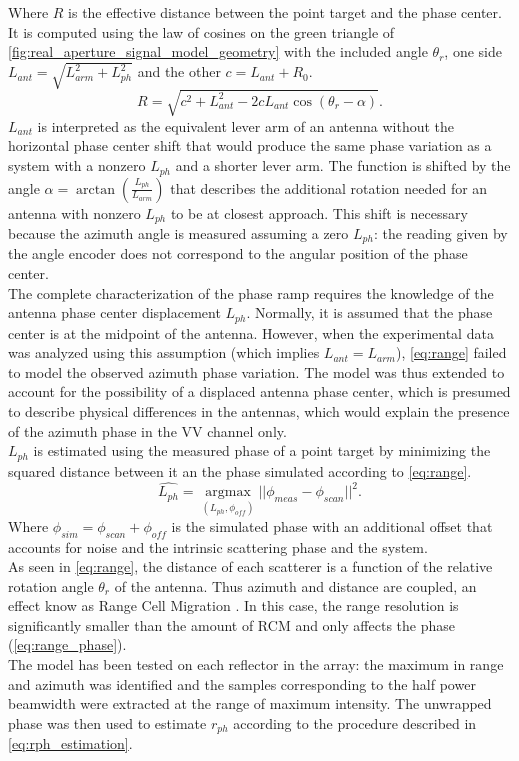Where $R$ is the effective distance between the point target and the phase center.
It is computed using the law of cosines on the green triangle of \autoref{fig:real_aperture_signal_model_geometry} with the included angle $\theta_r$, one  side $L_{ant} = \sqrt{L_{arm}^2 + L_{ph}^2}$ and the other $c = L_{ant} + R_0$.
\begin{equation}\label{eq:range}
	R = \sqrt{ c^2 +  L_{ant}^2 - 2 c L_{ant} \cos{\left(\theta_r - \alpha\right)}}.
\end{equation}
$L_{ant}$ is interpreted as the equivalent lever arm of an antenna without the horizontal phase center shift that would produce the same phase variation as a system with a nonzero $L_{ph}$ and a shorter lever arm.
The function is shifted by the angle  $\alpha = \operatorname{\arctan}\left({\frac{L_{ph}}{L_{arm}}}\right)$ that describes the additional rotation needed for an antenna with nonzero $L_{ph}$ to be at closest approach. This shift is necessary because the azimuth angle is measured assuming a zero $L_{ph}$: the reading given by the angle encoder does not correspond to the angular position of the phase center.\\
The complete characterization of the phase ramp requires the knowledge of the antenna phase center displacement $L_{ph}$. Normally, it is assumed that the phase center is at the midpoint of the antenna. However, when the experimental data was analyzed using this assumption (which implies $L_{ant} = L_{arm}$),  \autoref{eq:range} failed to model the observed azimuth phase variation. The model was thus extended to account for the possibility of a displaced antenna phase center, which is presumed to describe physical differences in the antennas, which would explain the presence of the azimuth phase in the VV channel only.\\ $L_{ph}$ is estimated using the measured phase of a point target by minimizing the squared distance between it an the phase simulated according to \autoref{eq:range}.
\begin{equation}\label{eq:rph_estimation}
	\hat{L_{ph}} = \underset{\left(L_{ph}, \phi_{off}\right)}{\operatorname{argmax}}{\vert\vert\phi_{meas} - \phi_{scan}\vert\vert}^2.
\end{equation}
Where $\phi_{sim} = \phi_{scan} + \phi_{off}$ is the simulated phase with an additional offset that accounts for noise and the intrinsic scattering phase and the system.\\
As seen in \autoref{eq:range}, the distance of each scatterer is a function of the relative rotation angle $\theta_r$ of the antenna. Thus azimuth and distance are coupled, an effect know as Range Cell Migration . In this case, the range resolution is significantly smaller than the amount of RCM and only affects the phase (\autoref{eq:range_phase}).\\
The model has been tested on each reflector in the array: the maximum in range and azimuth was identified and the samples corresponding to the half power beamwidth were extracted at the range of maximum intensity. The unwrapped phase was then used to estimate $r_{ph}$ according to the procedure described in \autoref{eq:rph_estimation}.



